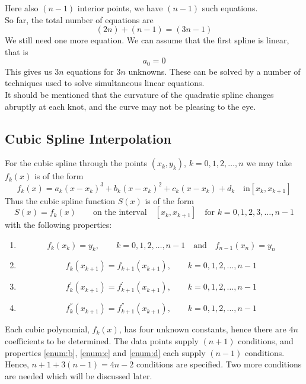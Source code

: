 \documentclass[12pt,class=book,crop=false]{standalone}
\begin{document}
Here also $ (n-1) $ interior points, we have $ (n-1) $ such equations.\\
So far, the total number of equations are
\[
	(2n)+(n-1)=(3n-1)
\]
We still need one more equation. We can assume that the first spline is linear, that is
\[
	a_0=0
\]
This gives us $ 3n $ equations for $ 3n $ unknowns.  These can be solved by a number of techniques used to solve simultaneous linear equations.\\
It should be mentioned that the curvature of the quadratic spline changes abruptly at each knot, and the curve may not be pleasing to the eye.
\subsection{Cubic Spline Interpolation}
For the cubic spline through the points $ (x_k,y_k ) $, $ k=0,1,2,\dots,n $ we may take $ f_k (x) $ is of the form
\begin{equation}
	\label{eq:cubespline1}
	f_k (x)=a_k (x-x_k )^3+b_k (x-x_k )^2+c_k (x-x_k)+d_k \quad \text{in} [x_k, x_{k+1}]
\end{equation}
Thus the cubic spline function $ S(x) $ is of the form
\[
	S(x)=f_k (x) \qquad\text{on the interval}\quad [x_k,x_{k+1}] \quad\text{for } k = 0, 1, 2, 3,\dots,n-1
\]
with the following properties:
\begin{enumerate}[label=(\alph*)]
	\item \label{enum:a}\[
		      f_k (x_k)=y_k,\qquad k=0,1,2,\dots,n-1\quad \text{and}\quad f_{n-1} (x_n)=y_n
	      \]
	\item \label{enum:b}\[
		      f_k (x_{k+1})=f_{k+1} (x_{k+1}),\qquad k=0,1,2,\dots,n-1
	      \]
	\item \label{enum:c}\[
		      f_k^{'} (x_{k+1})=f_{k+1}^{'} (x_{k+1}),\qquad k=0,1,2,\dots,n-1
	      \]
	\item \label{enum:d}\[
		      f_{k}^{''} (x_{k+1})=f_{k+1}^{''} (x_{k+1}),\qquad k=0,1,2,\dots,n-1
	      \]
\end{enumerate}
Each cubic polynomial, $ f_k (x) $, has four unknown constants, hence there are $ 4n $ coefficients to be determined. The data points supply $ (n+1) $ conditions, and properties \ref{enum:b}, \ref{enum:c} and \ref{enum:d} each supply $ (n-1) $ conditions. Hence, $ n+1+3(n-1)=4n-2 $ conditions are specified. Two more conditions are needed which will be discussed later.\\
\end{document}
